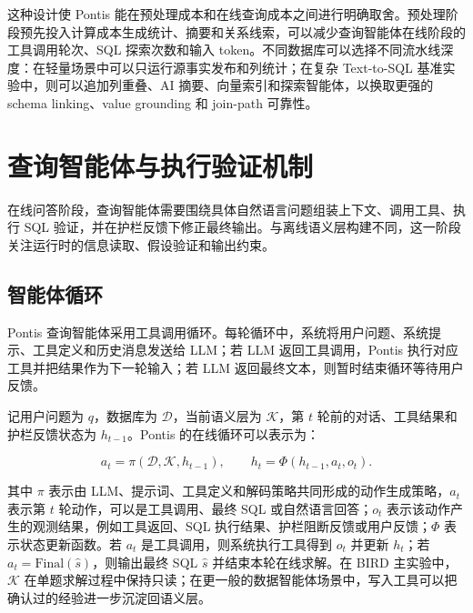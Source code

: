 \documentclass[
    bachelor,
    pdflinks,
]{xjtuthesis}
\begin{document}
这种设计使 Pontis 能在预处理成本和在线查询成本之间进行明确取舍。预处理阶段预先投入计算成本生成统计、摘要和关系线索，可以减少查询智能体在线阶段的工具调用轮次、SQL 探索次数和输入 token。不同数据库可以选择不同流水线深度：在轻量场景中可以只运行源事实发布和列统计；在复杂 Text-to-SQL 基准实验中，则可以追加列重叠、AI 摘要、向量索引和探索智能体，以换取更强的 schema linking、value grounding 和 join-path 可靠性。

\chapter{查询智能体与执行验证机制}

在线问答阶段，查询智能体需要围绕具体自然语言问题组装上下文、调用工具、执行 SQL 验证，并在护栏反馈下修正最终输出。与离线语义层构建不同，这一阶段关注运行时的信息读取、假设验证和输出约束。

\section{智能体循环}

Pontis 查询智能体采用工具调用循环。每轮循环中，系统将用户问题、系统提示、工具定义和历史消息发送给 LLM；若 LLM 返回工具调用，Pontis 执行对应工具并把结果作为下一轮输入；若 LLM 返回最终文本，则暂时结束循环等待用户反馈。

记用户问题为 $q$，数据库为 $\mathcal{D}$，当前语义层为 $\mathcal{K}$，第 $t$ 轮前的对话、工具结果和护栏反馈状态为 $h_{t-1}$。Pontis 的在线循环可以表示为：

\begin{equation}
a_t=\pi(\mathcal{D},\mathcal{K},h_{t-1}),\qquad
h_t=\Phi(h_{t-1},a_t,o_t).
\end{equation}

其中 $\pi$ 表示由 LLM、提示词、工具定义和解码策略共同形成的动作生成策略，$a_t$ 表示第 $t$ 轮动作，可以是工具调用、最终 SQL 或自然语言回答；$o_t$ 表示该动作产生的观测结果，例如工具返回、SQL 执行结果、护栏阻断反馈或用户反馈；$\Phi$ 表示状态更新函数。若 $a_t$ 是工具调用，则系统执行工具得到 $o_t$ 并更新 $h_t$；若 $a_t=\mathrm{Final}(\hat{s})$，则输出最终 SQL $\hat{s}$ 并结束本轮在线求解。在 BIRD 主实验中，$\mathcal{K}$ 在单题求解过程中保持只读；在更一般的数据智能体场景中，写入工具可以把确认过的经验进一步沉淀回语义层。
\end{document}
